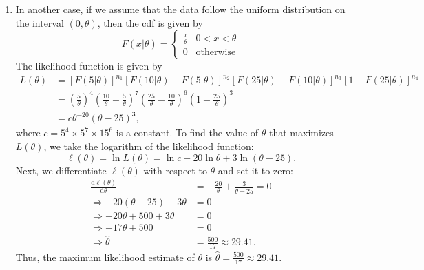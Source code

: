 \begin{solution}
\begin{enumerate}
        \item In another case, if we assume that the data follow the uniform distribution on the interval $(0, \theta)$, then the cdf is given by
        \[
            F(x|\theta) = \begin{cases}
                \frac{x}{\theta} & 0 < x < \theta\\
                0 & \text{otherwise}
            \end{cases}
        \]
        The likelihood function is given by
        \begin{align*}
            L(\theta) &= [F(5|\theta)]^{n_1} [F(10|\theta) - F(5|\theta)]^{n_2} [F(25|\theta) - F(10|\theta)]^{n_3} [1 - F(25|\theta)]^{n_4}\\
            &= \left(\frac{5}{\theta}\right)^4 \left(\frac{10}{\theta} - \frac {5}{\theta}\right)^7 \left(\frac{25}{\theta} - \frac{10}{\theta}\right)^6 \left(1 - \frac{25}{\theta}\right)^3\\
            &= c \theta^{-20} (\theta - 25)^3,
        \end{align*}
        where $c = 5^4 \times 5^7 \times 15^6$ is a constant. To find the value of $\theta$ that maximizes $L(\theta)$, we take the logarithm of the likelihood function:
        \[
            \ell(\theta) = \ln L(\theta) = \ln c - 20 \ln \theta + 3 \ln(\theta - 25).
        \]
        Next, we differentiate $\ell(\theta)$ with respect to $\theta$ and set it to zero:
        \begin{align*}
            \frac{\mathrm{d}\ell(\theta)}{\mathrm{d}\theta} &= -\frac{20}{\theta} + \frac{3}{\theta - 25} = 0\\
            \Rightarrow -20(\theta - 25) + 3\theta &= 0\\
            \Rightarrow -20\theta + 500 + 3\theta &= 0\\
            \Rightarrow -17\theta + 500 &= 0\\
            \Rightarrow \hat{\theta} &= \frac{500}{17} \approx 29.41.
        \end{align*}
        Thus, the maximum likelihood estimate of $\theta$ is $\hat{\theta} = \frac{500}{17} \approx 29.41$. 
    \end{enumerate}
\end{solution}